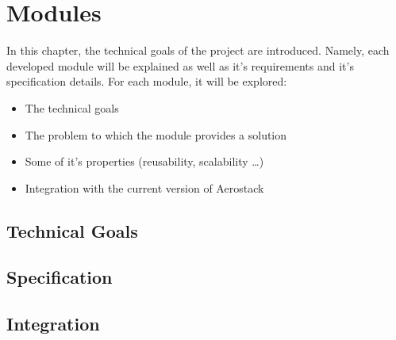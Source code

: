 \chapter{Modules}

In this chapter, the technical goals of the project are introduced. Namely, each developed module will be explained as well as it's requirements and it's specification details. For each module, it will be explored:

\begin{itemize}
  \item The technical goals
  \item The problem to which the module provides a solution
  \item Some of it's properties (reusability, scalability \dots)
  \item Integration with the current version of Aerostack
\end{itemize}

\section{Technical Goals}

\section{Specification}

\section{Integration}

\begin{comment}
  \begin{itemize}
  \end{itemize}
\end{comment}
